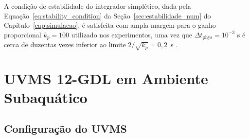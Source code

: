 A condição de estabilidade do integrador simplético, dada pela Equação~\eqref{eq:stability_condition} da Seção~\ref{sec:estabilidade_num} do Capítulo~\ref{cap:simulacao}, é satisfeita com ampla margem para o ganho proporcional $k_p = 100$ utilizado nos experimentos, uma vez que $\Delta t_{\text{phys}} = 10^{-3}$ s é cerca de duzentas vezes inferior ao limite $2/\sqrt{k_p} = 0,2$~s \cite{leimkuhler2004simulating}.

\section{UVMS 12-GDL em Ambiente Subaquático}
\label{sec:cenario2}

\subsection{Configuração do UVMS}
\label{sec:uvms_config}

